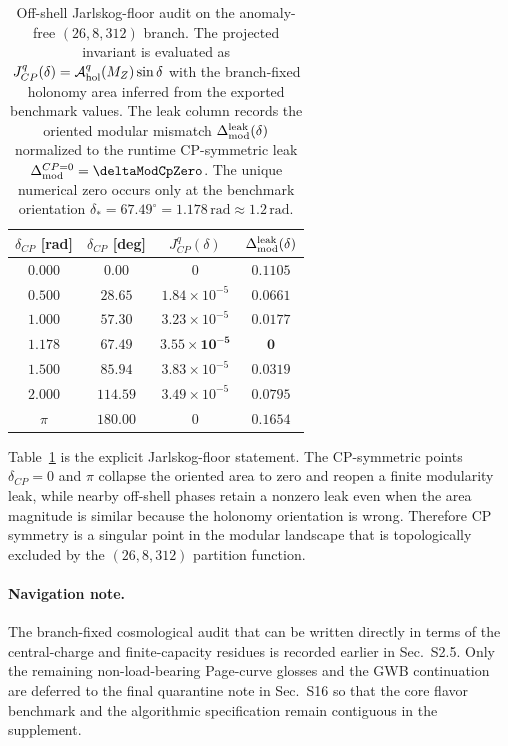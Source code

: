 \documentclass[11pt]{article}
\begin{document}
\begin{table}[t]
\centering
\small
\begin{tabular}{cccc}
\toprule
$\delta_{CP}$ [rad] & $\delta_{CP}$ [deg] & $J_{CP}^{q}(\delta)$ & $\Delta_{\rm mod}^{\rm leak}(\delta)$ \\
\midrule
$0.000$ & $0.00$ & $0$ & $0.1105$ \\
$0.500$ & $28.65$ & $1.84\times10^{-5}$ & $0.0661$ \\
$1.000$ & $57.30$ & $3.23\times10^{-5}$ & $0.0177$ \\
$\mathbf{1.178}$ & $\mathbf{67.49}$ & $\mathbf{3.55\times10^{-5}}$ & $\mathbf{0}$ \\
$1.500$ & $85.94$ & $3.83\times10^{-5}$ & $0.0319$ \\
$2.000$ & $114.59$ & $3.49\times10^{-5}$ & $0.0795$ \\
$\pi$ & $180.00$ & $0$ & $0.1654$ \\
\bottomrule
\end{tabular}
\caption{Off-shell Jarlskog-floor audit on the anomaly-free $(26,8,312)$ branch. The projected invariant is evaluated as $J_{CP}^{q}(\delta)=\mathcal A_{\rm hol}^{q}(M_Z)\sin\delta$ with the branch-fixed holonomy area inferred from the exported benchmark values. The leak column records the oriented modular mismatch $\Delta_{\rm mod}^{\rm leak}(\delta)$ normalized to the runtime CP-symmetric leak $\Delta_{\rm mod}^{CP=0}=\deltaModCpZero$. The unique numerical zero occurs only at the benchmark orientation $\delta_* = 67.49^{\circ}=1.178\,\mathrm{rad}\approx1.2\,\mathrm{rad}$.}
\label{tab:s11-jarlskog-floor}
\end{table}

Table~\ref{tab:s11-jarlskog-floor} is the explicit Jarlskog-floor statement.
The CP-symmetric points $\delta_{CP}=0$ and $\pi$ collapse the oriented area
to zero and reopen a finite modularity leak, while nearby off-shell phases
retain a nonzero leak even when the area magnitude is similar because the
holonomy orientation is wrong. Therefore CP symmetry is a singular point in the
modular landscape that is topologically excluded by the $(26,8,312)$ partition
function.

\paragraph{Navigation note.}
The branch-fixed cosmological audit that can be written directly in terms of the central-charge and finite-capacity residues is recorded earlier in Sec.~S2.5. Only the remaining non-load-bearing Page-curve glosses and the GWB continuation are deferred to the final quarantine note in Sec.~S16 so that the core flavor benchmark and the algorithmic specification remain contiguous in the supplement.
\end{document}
